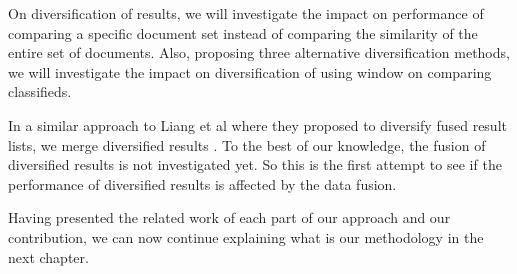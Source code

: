 On diversification of results, we will investigate the impact on performance of comparing a specific document set instead of comparing the similarity of the entire set of documents. Also, proposing three alternative diversification methods, we will investigate the impact on diversification of using window on comparing classifieds.

In a similar approach to Liang et al where they proposed to diversify fused result lists, we merge diversified results \cite{LiangRenMaarten}. To the best of our knowledge, the fusion of diversified results is not investigated yet. So this is the first attempt to see if the performance of diversified results is affected by the data fusion.

Having presented the related work of each part of our approach and our contribution, we can now continue explaining what is our methodology in the next chapter.